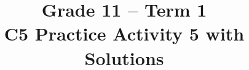 
\makeatletter
{}
\makeatother




\COneTonePracticePalette





\usepackage{longtable}


\setlength{\DistributionGraphWidth}{0.6\textwidth}
\setlength{\DistributionGraphHeight}{6cm}

\setlength{\DistributionGraphHeightCompact}{3.5cm}

\title{Grade 11 -- Term 1 \\ C5 Practice Activity 5 with Solutions}
\author{}
\date{}

\pagestyle{empty}


\newcommand{\SolvedGraph}[2]{%
	\par\smallskip
	\Needspace{4.6cm}%
	\begin{center}
		\textbf{\small #1}\par\vspace{-1mm}
		\begin{minipage}{\textwidth}
			#2
		\end{minipage}%
	\end{center}
	\vspace{-2mm}%
}

\newcommand{\SolutionStage}[2]{%
	\Needspace{6\baselineskip}%
	\subsubsection{#2}%
}



	\maketitle
	\setcounter{tocdepth}{1}
	\setcounter{secnumdepth}{2}
	\label{toc}
	\vspace*{-20mm}
	\tableofcontents
	
